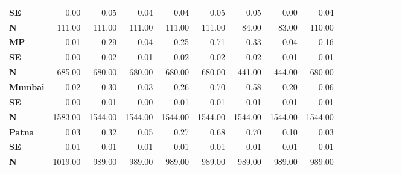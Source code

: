 \begin{tabular}{@{\extracolsep{5pt}}lrrrrrrrrrrrrrrr}
{\bf SE} & 0.00\phantom{***} & 0.05\phantom{***} & 0.04\phantom{***} & 0.04\phantom{***} & 0.05\phantom{***} & 0.05\phantom{***} & 0.00\phantom{***} & 0.04\phantom{***} \\
{\bf N} & 111.00\phantom{***} & 111.00\phantom{***} & 111.00\phantom{***} & 111.00\phantom{***} & 111.00\phantom{***} & 84.00\phantom{***} & 83.00\phantom{***} & 110.00\phantom{***} \\
{\bf MP} & 0.01\phantom{***} & 0.29\phantom{***} & 0.04\phantom{***} & 0.25\phantom{***} & 0.71\phantom{***} & 0.33\phantom{***} & 0.04\phantom{***} & 0.16\phantom{***} \\
{\bf SE} & 0.00\phantom{***} & 0.02\phantom{***} & 0.01\phantom{***} & 0.02\phantom{***} & 0.02\phantom{***} & 0.02\phantom{***} & 0.01\phantom{***} & 0.01\phantom{***} \\
{\bf N} & 685.00\phantom{***} & 680.00\phantom{***} & 680.00\phantom{***} & 680.00\phantom{***} & 680.00\phantom{***} & 441.00\phantom{***} & 444.00\phantom{***} & 680.00\phantom{***} \\
{\bf Mumbai} & 0.02\phantom{***} & 0.30\phantom{***} & 0.03\phantom{***} & 0.26\phantom{***} & 0.70\phantom{***} & 0.58\phantom{***} & 0.20\phantom{***} & 0.06\phantom{***} \\
{\bf SE} & 0.00\phantom{***} & 0.01\phantom{***} & 0.00\phantom{***} & 0.01\phantom{***} & 0.01\phantom{***} & 0.01\phantom{***} & 0.01\phantom{***} & 0.01\phantom{***} \\
{\bf N} & 1583.00\phantom{***} & 1544.00\phantom{***} & 1544.00\phantom{***} & 1544.00\phantom{***} & 1544.00\phantom{***} & 1544.00\phantom{***} & 1544.00\phantom{***} & 1544.00\phantom{***} \\
{\bf Patna} & 0.03\phantom{***} & 0.32\phantom{***} & 0.05\phantom{***} & 0.27\phantom{***} & 0.68\phantom{***} & 0.70\phantom{***} & 0.10\phantom{***} & 0.03\phantom{***} \\
{\bf SE} & 0.01\phantom{***} & 0.01\phantom{***} & 0.01\phantom{***} & 0.01\phantom{***} & 0.01\phantom{***} & 0.01\phantom{***} & 0.01\phantom{***} & 0.01\phantom{***} \\
{\bf N} & 1019.00\phantom{***} & 989.00\phantom{***} & 989.00\phantom{***} & 989.00\phantom{***} & 989.00\phantom{***} & 989.00\phantom{***} & 989.00\phantom{***} & 989.00\phantom{***} \\
\hline
\end{tabular}
